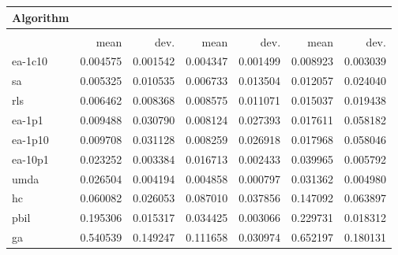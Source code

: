 \begin{tabular}{@{} l *{6}{>{{}}N{1}{2}} @{}}
\toprule
{Algorithm} &  \\
\midrule
&  &  &  \\
\midrule
& {mean} & {dev.} & {mean} & {dev.} & {mean} & {dev.} \\
\midrule
ea-1c10 & 0.004575 & 0.001542 & 0.004347 & 0.001499 & 0.008923 & 0.003039 \\
sa & 0.005325 & 0.010535 & 0.006733 & 0.013504 & 0.012057 & 0.024040 \\
rls & 0.006462 & 0.008368 & 0.008575 & 0.011071 & 0.015037 & 0.019438 \\
ea-1p1 & 0.009488 & 0.030790 & 0.008124 & 0.027393 & 0.017611 & 0.058182 \\
ea-1p10 & 0.009708 & 0.031128 & 0.008259 & 0.026918 & 0.017968 & 0.058046 \\
ea-10p1 & 0.023252 & 0.003384 & 0.016713 & 0.002433 & 0.039965 & 0.005792 \\
umda & 0.026504 & 0.004194 & 0.004858 & 0.000797 & 0.031362 & 0.004980 \\
hc & 0.060082 & 0.026053 & 0.087010 & 0.037856 & 0.147092 & 0.063897 \\
pbil & 0.195306 & 0.015317 & 0.034425 & 0.003066 & 0.229731 & 0.018312 \\
ga & 0.540539 & 0.149247 & 0.111658 & 0.030974 & 0.652197 & 0.180131 \\
\bottomrule
\end{tabular}
